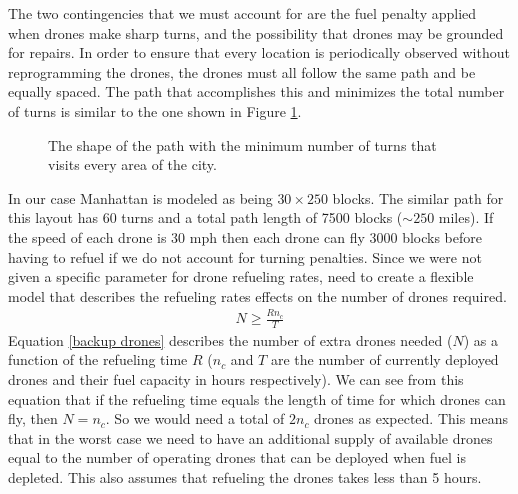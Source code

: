 \documentclass{article}
\begin{document}
The two contingencies that we must account for are the fuel penalty applied when drones make sharp turns, and the possibility that drones may be grounded for repairs. In order to ensure that every location is periodically observed without reprogramming the drones, the drones must all follow the same path and be equally spaced. The path that accomplishes this and minimizes the total number of turns is similar to the one shown in Figure \ref{path}.
\begin{figure}[htb!]
    \caption{The shape of the path with the minimum number of turns that visits every area of the city.}
    \label{path}
\end{figure}
\newline In our case Manhattan is modeled as being $30\times 250$ blocks. The similar path for this layout has 60 turns and a total path length of 7500 blocks ($\sim 250$ miles). If the speed of each drone is 30 mph then each drone can fly 3000 blocks before having to refuel if we do not account for turning penalties. Since we were not given a specific parameter for drone refueling rates, need to create a flexible model that describes the refueling rates effects on the number of drones required.
\begin{eqnarray}
N \geq \frac{R n_{c}}{T}\label{backup drones}
\end{eqnarray}
Equation \ref{backup drones} describes the number of extra drones needed ($N$) as a function of the refueling time $R$ ($n_{c}$ and $T$ are the number of currently deployed drones and their fuel capacity in hours respectively). We can see from this equation that if the refueling time equals the length of time for which drones can fly, then $N = n_{c}$.  So we would need a total of $2n_{c}$ drones as expected.
This means that in the worst case we need to have an additional supply of available drones equal to the number of operating drones that can be deployed when fuel is depleted. This also assumes that refueling the drones takes less than 5 hours.
\end{document}
